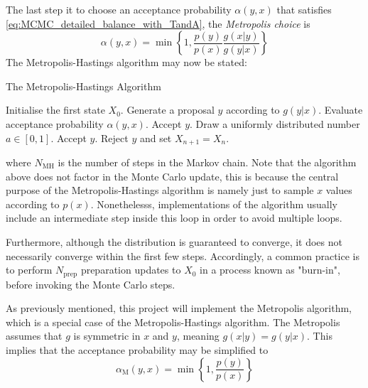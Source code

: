 \documentclass[nofootinbib,reprint,english]{revtex4-1}
\begin{document}
The last step it to choose an acceptance probability \(\alpha(y,x)\) that satisfies \ref{eq:MCMC_detailed_balance_with_TandA}, the \emph{Metropolis choice} is
\begin{equation}\label{eq:Metropolis_Hastings_acceptance_probability}
\alpha(y,x)=\min\left\lbrace 1,\frac{p(y)}{p(x)}\frac{g(x|y)}{g(y|x)}\right\rbrace
\end{equation}
The Metropolis-Hastings algorithm may now be stated:
\begin{algorithm}[H]
\caption{The Metropolis-Hastings Algorithm}\label{algo:Metropolis_Hastings}
\begin{algorithmic}[1]
\State Initialise the first state \(X_0\).
	\State Generate a proposal \(y\) according to \(g(y|x)\).
	\State Evaluate acceptance probability \(\alpha(y,x)\).
		\State Accept \(y\).
	\Else
		\State Draw a uniformly distributed number \(a\in[0,1]\).
			\State Accept \(y\).
		\Else
			\State Reject \(y\) and set \(X_{n+1}=X_n\).
		\EndIf
	\EndIf
\EndFor
\end{algorithmic}
\end{algorithm}
where \(N_\text{MH}\) is the number of steps in the Markov chain. Note that the algorithm above does not factor in the Monte Carlo update, this is because the central purpose of the Metropolis-Hastings algorithm is namely just to sample \(x\) values according to \(p(x)\). Nonethelesss, implementations of the algorithm usually include an intermediate step inside this loop in order to avoid multiple loops.

Furthermore, although the distribution is guaranteed to converge, it does not necessarily converge within the first few steps. Accordingly, a common practice is to perform \(N_\text{prep}\) preparation updates to \(X_0\) in a process known as "burn-in", before invoking the Monte Carlo steps.

As previously mentioned, this project will implement the Metropolis algorithm, which is a special case of the Metropolis-Hastings algorithm. The Metropolis assumes that \(g\) is symmetric in \(x\) and \(y\), meaning \(g(x|y)=g(y|x)\). This implies that the acceptance probability may be simplified to
\begin{equation}\label{eq:Metropolis_acceptance_probability}
\alpha_\text{M}(y,x)=\min\left\lbrace1,\frac{p(y)}{p(x)}\right\rbrace
\end{equation}
\end{document}

